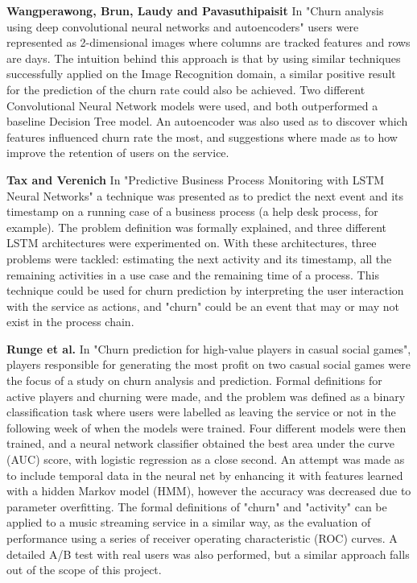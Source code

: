 \documentclass{kththesis}
\begin{document}
\textbf{Wangperawong, Brun, Laudy and Pavasuthipaisit} \citep{Wangperawong2016} In "Churn analysis using deep convolutional neural networks and autoencoders" users were represented as 2-dimensional images where columns are tracked features and rows are days. The intuition behind this approach is that by using similar techniques successfully applied on the Image Recognition domain, a similar positive result for the prediction of the churn rate could also be achieved. Two different Convolutional Neural Network models were used, and both outperformed a baseline Decision Tree model. An autoencoder was also used as to discover which features influenced churn rate the most, and suggestions where made as to how improve the retention of users on the service.

\textbf{Tax and Verenich} \citep{Tax2016} In "Predictive Business Process Monitoring with LSTM Neural Networks" a technique was presented as to predict the next event and its timestamp on a running case of a business process (a help desk process, for example). The problem definition was formally explained, and three different LSTM architectures were experimented on. With these architectures, three problems were tackled: estimating the next activity and its timestamp, all the remaining activities in a use case and the remaining time of a process. This technique could be used for churn prediction by interpreting the user interaction with the service as actions, and "churn" could be an event that may or may not exist in the process chain.

\textbf{Runge et al.} \citep{Runge2014} In "Churn prediction for high-value players in casual social games", players responsible for generating the most profit on two casual social games were the focus of a study on churn analysis and prediction. Formal definitions for active players and churning were made, and the problem was defined as a binary classification task where users were labelled as leaving the service or not in the following week of when the models were trained. Four different models were then trained, and a neural network classifier obtained the best area under the curve (AUC) score, with logistic regression as a close second. An attempt was made as to include temporal data in the neural net by enhancing it with features learned with a hidden Markov model (HMM), however the accuracy was decreased due to parameter overfitting. The formal definitions of "churn" and "activity" can be applied to a music streaming service in a similar way, as the evaluation of performance using a series of receiver operating characteristic (ROC) curves. A detailed A/B test with real users was also performed, but a similar approach falls out of the scope of this project.
\end{document}
